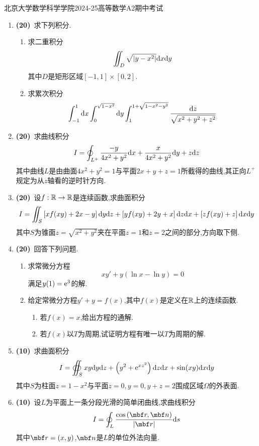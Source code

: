 \documentclass{ctexart}
\begin{document}
\pagestyle{empty}
\begin{center}\Large
    北京大学数学科学学院2024-25高等数学A2期中考试
\end{center}
\begin{enumerate}[leftmargin=*,label=\textbf{\arabic*.}]
    \item \textbf{(20)}\ 求下列积分.
    \begin{enumerate}[label=\tbf{(\arabic*)}]
        \item 求二重积分
            \[\iint_D\sqrt{\left|y-x^2\right|}\mathrm{d} x\mathrm{d} y\]
            其中$D$是矩形区域$[-1,1]\times[0,2]$.
        \item 求累次积分
            \[\int_{-1}^1\mathrm{d} x\int_0^{\sqrt{1-x^2}}\mathrm{d} y\int_1^{1+\sqrt{1-x^2-y^2}}\dfrac{\mathrm{d} z}{\sqrt{x^2+y^2+z^2}}\]

    \end{enumerate}

    \item \textbf{(20)}\ 求曲线积分
    \[I=\oint_{L^+}\dfrac{-y}{4x^2+y^2}\mathrm{d} x+\dfrac{x}{4x^2+y^2}\mathrm{d} y+z\mathrm{d} z\]
    其中曲线$L$是由曲面$4x^2+y^2=1$与平面$2x+y+z=1$所截得的曲线,其正向$L^+$规定为从$z$轴看的逆时针方向.

    \item \textbf{(20)}\ 设$f:\mathbb{R}\to\mathbb{R}$是连续函数,求曲面积分
    \[I=\iint_S\left[xf(xy)+2x-y\right]\mathrm{d} y\mathrm{d} z+\left[yf(xy)+2y+x\right]\mathrm{d} z\mathrm{d} x+\left[zf(xy)+z\right]\mathrm{d} x\mathrm{d} y\]
    其中$S$为锥面$z=\sqrt{x^2+y^2}$夹在平面$z=1$和$z=2$之间的部分,方向取下侧.

    \item \textbf{(20)}\ 回答下列问题.
    \begin{enumerate}[label=\tbf{(\arabic*)}]
        \item 求常微分方程
            \[xy'+y\left(\ln x-\ln y\right)=0\]
            满足$y(1)=\mathrm{e}^3$的解.
        \item 给定常微分方程$y'+y=f(x)$,其中$f(x)$是定义在$\mathbb{R}$上的连续函数.
            \begin{enumerate}[label=\tbf{(\alph*)}]
                \item 若$f(x)=x$,给出方程的通解.
                \item 若$f(x)$以$T$为周期,试证明方程有唯一以$T$为周期的解.
            \end{enumerate}
    \end{enumerate}

    \item \textbf{(10)}\ 求曲面积分
    \[I=\oiint_{S}xy\mathrm{d} y\mathrm{d} z+\left(y^2+\mathrm{e}^{xz^2}\right)\mathrm{d} z\mathrm{d} x+\sin(xy)\mathrm{d} x\mathrm{d} y\]
    其中$S$为柱面$z=1-x^2$与平面$z=0,y=0,y+z=2$围成区域$\Omega$的外表面.

    \item \textbf{(10)}\ 设$L$为平面上一条分段光滑的简单闭曲线,求曲线积分
    \[I=\oint_{L}\dfrac{\cos\left(\mbf r,\mbf n\right)}{\left|\mbf r\right|}\di s\]
    其中$\mbf r=(x,y)$,$\mbf n$是$L$的单位外法向量.

\end{enumerate}
\end{document}
